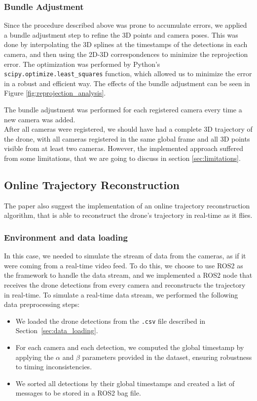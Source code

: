 \documentclass[11pt]{article}
\begin{document}
\subsubsection{Bundle Adjustment}

Since the procedure described above was prone to accumulate errors, we applied a bundle adjustment step to refine the 3D points and camera poses. This was done by interpolating the 3D splines at the timestamps of the detections in each camera, and then using the 2D-3D correspondences to minimize the reprojection error. The optimization was performed by Python's \texttt{scipy.optimize.least\_squares} function, which allowed us to minimize the error in a robust and efficient way. The effects of the bundle adjustment can be seen in Figure \ref{fig:reprojection_analysis}.

The bundle adjustment was performed for each registered camera every time a new camera was added.\\

After all cameras were registered, we should have had a complete 3D trajectory of the drone, with all cameras registered in the same global frame and all 3D points visible from at least two cameras. However, the implemented approach suffered from some limitations, that we are going to discuss in section \ref{sec:limitations}.

\subsection{Online Trajectory Reconstruction}

The paper also suggest the implementation of an online trajectory reconstruction algorithm, that is able to reconstruct the drone's trajectory in real-time as it flies.

\subsubsection{Environment and data loading}

In this case, we needed to simulate the stream of data from the cameras, as if it were coming from a real-time video feed. To do this, we choose to use ROS2 as the framework to handle the data stream, and we implemented a ROS2 node that receives the drone detections from every camera and reconstructs the trajectory in real-time.
To simulate a real-time data stream, we performed the following data preprocessing steps:
\begin{itemize}
    \item We loaded the drone detections from the \texttt{.csv} file described in Section~\ref{sec:data_loading}.
    \item For each camera and each detection, we computed the global timestamp by applying the $\alpha$ and $\beta$ parameters provided in the dataset, ensuring robustness to timing inconsistencies.
    \item We sorted all detections by their global timestamps and created a list of messages to be stored in a ROS2 bag file.
\end{itemize}
\end{document}
